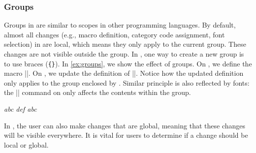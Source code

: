 \subsubsection{Groups}
Groups in \LT{} are similar to scopes in other programming languages.
By default, almost all changes (e.g., macro definition, category code assignment, font selection) in \LT{} are local, which means they only apply to the current group.
These changes are not visible outside the group.
In \LT{}, one way to create a new group is to use braces (\verb|{}|).
In \cref{ex:groups}, we show the effect of groups.
On , we define the macro \inltex|\abc|.
On , we update the definition of \inltex|\abc|.
Notice how the updated definition only applies to the group enclosed by .
Similar principle is also reflected by fonts: the \inltex|\normalfont| command on  only affects the contents within the group.
\begin{latexsample}[examplelabel={ex:groups},exampletitle={Groups}]
\itshape
\def\abc{abc }%
\abc%
{%
  \normalfont%
  \def\abc{def }%
  \abc%
}%
\abc%
\end{latexsample}
\noindent In \LT{}, the user can also make changes that are global, meaning that these changes will be visible everywhere.
It is vital for \LT{} users to determine if a change should be local or global.


